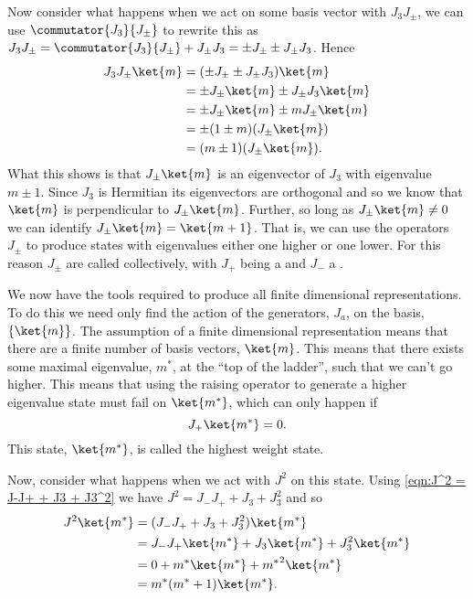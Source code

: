 Now consider what happens when we act on some basis vector with \(J_3J_{\pm}\), we can use \(\commutator{J_3}{J_{\pm}}\) to rewrite this as \(J_3J_{\pm} = \commutator{J_3}{J_{\pm}} + J_{\pm}J_3 = \pm J_{\pm} \pm J_{\pm}J_3\).
Hence
\begin{align}
    J_3J_{\pm}\ket{m} &= (\pm J_{\pm} \pm J_{\pm}J_3)\ket{m}\\
    &= \pm J_{\pm}\ket{m} \pm J_{\pm} J_3\ket{m}\\
    &= \pm J_{\pm}\ket{m} \pm mJ_{\pm}\ket{m}\\
    &= \pm (1 \pm m)(J_{\pm}\ket{m})\\
    &= (m \pm 1)(J_{\pm}\ket{m}).
\end{align}
What this shows is that \(J_{\pm}\ket{m}\) is an eigenvector of \(J_3\) with eigenvalue \(m\pm 1\).
Since \(J_3\) is Hermitian its eigenvectors are orthogonal and so we know that \(\ket{m}\) is perpendicular to \(J_{\pm}\ket{m}\).
Further, so long as \(J_{\pm}\ket{m} \ne 0\) we can identify \(J_{\pm}\ket{m} = \ket{m + 1}\).
That is, we can use the operators \(J_{\pm}\) to produce states with eigenvalues either one higher or one lower.
For this reason \(J_{\pm}\) are called  collectively, with \(J_+\) being a  and \(J_-\) a .

We now have the tools required to produce all finite dimensional representations.
To do this we need only find the action of the generators, \(J_a\), on the basis, \(\{\ket{m}\}\).
The assumption of a finite dimensional representation means that there are a finite number of basis vectors, \(\ket{m}\).
This means that there exists some maximal eigenvalue, \(m^*\), at the \enquote{top of the ladder}, such that we can't go higher.
This means that using the raising operator to generate a higher eigenvalue state must fail on \(\ket{m^*}\), which can only happen if
\begin{equation}
    J_+\ket{m^*} = 0.
\end{equation}
This state, \(\ket{m^*}\), is called the highest weight state.

Now, consider what happens when we act with \(J^2\) on this state.
Using \cref{eqn:J^2 = J-J+ + J3 + J3^2} we have \(J^2 = J_-J_+ + J_3 + J_3^2\) and so 
\begin{align}
    J^2\ket{m^*} &= (J_-J_+ + J_3 + J_3^2)\ket{m^*}\\
    &= J_-J_+\ket{m^*} + J_3\ket{m^*} + J_3^2\ket{m^*}\\
    &= 0 + m^*\ket{m^*} + {m^*}^2\ket{m^*}\\
    &= m^*(m^* + 1)\ket{m^*}.
\end{align}

